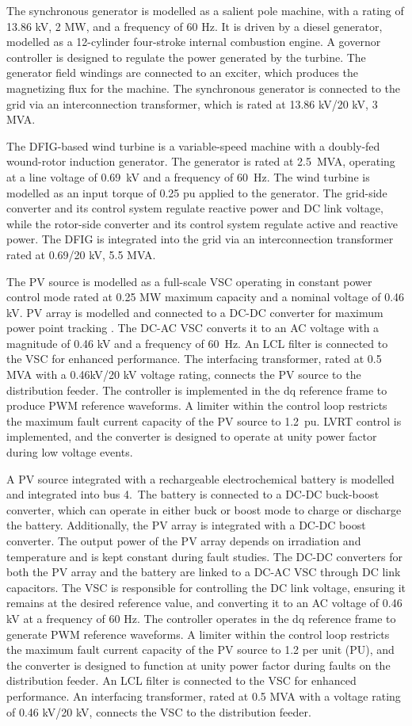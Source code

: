 The synchronous generator is modelled as a salient pole machine, with a rating of 13.86 kV, 2 MW, and a frequency of 60 Hz. It is driven by a diesel generator, modelled as a 12-cylinder four-stroke internal combustion engine. A governor controller is designed to regulate the power generated by the turbine. The generator field windings are connected to an exciter, which produces the magnetizing flux for the machine. The synchronous generator is connected to the grid via an interconnection transformer, which is rated at 13.86 kV/20 kV, 3 MVA.

The DFIG-based wind turbine is a variable-speed machine with a doubly-fed wound-rotor induction generator. The generator is rated at 2.5~MVA, operating at a line voltage of 0.69~kV and a frequency of 60~Hz. The wind turbine is modelled as an input torque of 0.25 pu applied to the generator. The grid-side converter and its control system regulate reactive power and DC link voltage, while the rotor-side converter and its control system regulate active and reactive power. The DFIG is integrated into the grid via an interconnection transformer rated at 0.69/20 kV, 5.5 MVA.

The PV source is modelled as a full-scale VSC operating in constant power control mode rated at 0.25 MW maximum capacity and a nominal voltage of 0.46 kV. PV array is modelled and connected to a DC-DC converter for maximum power point tracking \cite{mppttracking}. The DC-AC VSC converts it to an AC voltage with a magnitude of 0.46 kV and a frequency of 60~Hz. An LCL filter is connected to the VSC for enhanced performance. The interfacing transformer, rated at 0.5 MVA with a 0.46kV/20 kV voltage rating, connects the PV source to the distribution feeder. The controller is implemented in the dq reference frame to produce PWM reference waveforms. A limiter within the control loop restricts the maximum fault current capacity of the PV source to 1.2~pu. LVRT control is implemented, and the converter is designed to operate at unity power factor during low voltage events.

A PV source integrated with a rechargeable electrochemical battery is modelled and integrated into bus 4.~The battery is connected to a DC-DC buck-boost converter, which can operate in either buck or boost mode to charge or discharge the battery. Additionally, the PV array is integrated with a DC-DC boost converter. The output power of the PV array depends on irradiation and temperature and is kept constant during fault studies. The DC-DC converters for both the PV array and the battery are linked to a DC-AC VSC through DC link capacitors. The VSC is responsible for controlling the DC link voltage, ensuring it remains at the desired reference value, and converting it to an AC voltage of 0.46 kV at a frequency of 60 Hz. The controller operates in the dq reference frame to generate PWM reference waveforms. A limiter within the control loop restricts the maximum fault current capacity of the PV source to 1.2 per unit (PU), and the converter is designed to function at unity power factor during faults on the distribution feeder. An LCL filter is connected to the VSC for enhanced performance. An interfacing transformer, rated at 0.5 MVA with a voltage rating of 0.46 kV/20 kV, connects the VSC to the distribution feeder.

